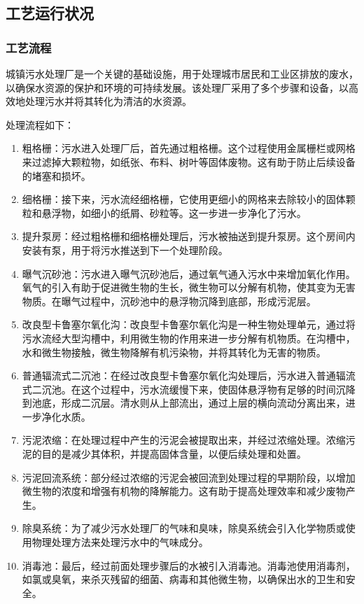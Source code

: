 \subsection{工艺运行状况}
\subsubsection{工艺流程}
城镇污水处理厂是一个关键的基础设施，用于处理城市居民和工业区排放的废水，以确保水资源的保护和环境的可持续发展。该处理厂采用了多个步骤和设备，以高效地处理污水并将其转化为清洁的水资源。

处理流程如下：
\begin{enumerate}
	\item 粗格栅：污水进入处理厂后，首先通过粗格栅。这个过程使用金属栅栏或网格来过滤掉大颗粒物，如纸张、布料、树叶等固体废物。这有助于防止后续设备的堵塞和损坏。
	\item 细格栅：接下来，污水流经细格栅，它使用更细小的网格来去除较小的固体颗粒和悬浮物，如细小的纸屑、砂粒等。这一步进一步净化了污水。
	\item 提升泵房：经过粗格栅和细格栅处理后，污水被抽送到提升泵房。这个房间内安装有泵，用于将污水推送到下一个处理阶段。
	\item 曝气沉砂池：污水进入曝气沉砂池后，通过氧气通入污水中来增加氧化作用。氧气的引入有助于促进微生物的生长，微生物可以分解有机物，使其变为无害物质。在曝气过程中，沉砂池中的悬浮物沉降到底部，形成污泥层。
	\item 改良型卡鲁塞尔氧化沟：改良型卡鲁塞尔氧化沟是一种生物处理单元，通过将污水流经大型沟槽中，利用微生物的作用来进一步分解有机物质。在沟槽中，水和微生物接触，微生物降解有机污染物，并将其转化为无害的物质。
	\item 普通辐流式二沉池：在经过改良型卡鲁塞尔氧化沟处理后，污水进入普通辐流式二沉池。在这个过程中，污水流缓慢下来，使固体悬浮物有足够的时间沉降到池底，形成二沉层。清水则从上部流出，通过上层的横向流动分离出来，进一步净化水质。
	\item 污泥浓缩：在处理过程中产生的污泥会被提取出来，并经过浓缩处理。浓缩污泥的目的是减少其体积，并提高固体含量，以便后续处理和处置。
	\item 污泥回流系统：部分经过浓缩的污泥会被回流到处理过程的早期阶段，以增加微生物的浓度和增强有机物的降解能力。这有助于提高处理效率和减少废物产生。
	\item 除臭系统：为了减少污水处理厂的气味和臭味，除臭系统会引入化学物质或使用物理处理方法来处理污水中的气味成分。
	\item 消毒池：最后，经过前面处理步骤后的水被引入消毒池。消毒池使用消毒剂，如氯或臭氧，来杀灭残留的细菌、病毒和其他微生物，以确保出水的卫生和安全。
\end{enumerate}

